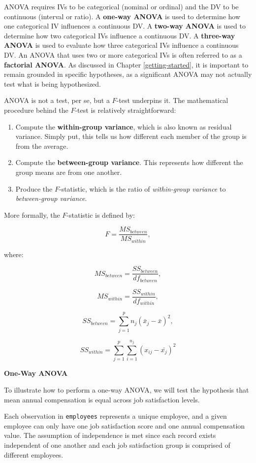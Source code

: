\documentclass[]{book}
\providecommand{\tightlist}{%
  \setlength{\itemsep}{0pt}\setlength{\parskip}{0pt}}
\begin{document}
ANOVA requires IVs to be categorical (nominal or ordinal) and the DV to be continuous (interval or ratio). A \textbf{one-way ANOVA} is used to determine how one categorical IV influences a continuous DV. A \textbf{two-way ANOVA} is used to determine how two categorical IVs influence a continuous DV. A \textbf{three-way ANOVA} is used to evaluate how three categorical IVs influence a continuous DV. An ANOVA that uses two or more categorical IVs is often referred to as a \textbf{factorial ANOVA}. As discussed in Chapter \ref{getting-started}, it is important to remain grounded in specific hypotheses, as a significant ANOVA may not actually test what is being hypothesized.

ANOVA is not a test, per se, but a \(F\)-test underpins it. The mathematical procedure behind the \(F\)-test is relatively straightforward:

\begin{enumerate}
\def\labelenumi{\arabic{enumi}.}
\tightlist
\item
  Compute the \textbf{within-group variance}, which is also known as residual variance. Simply put, this tells us how different each member of the group is from the average.
\item
  Compute the \textbf{between-group variance}. This represents how different the group means are from one another.
\item
  Produce the \(F\)-statistic, which is the ratio of \emph{within-group variance} to \emph{between-group variance}.
\end{enumerate}

More formally, the \(F\)-statistic is defined by:

\[ F = \frac{MS_{between}}{MS_{within}}, \]

where:

\[ MS_{between} = \frac{SS_{between}}{df_{between}}, \]

\[ MS_{within} = \frac{SS_{within}}{df_{within}}, \]

\[ SS_{between} = \displaystyle\sum_{j=1}^{p} n_j(\bar{x}_j-\bar{x})^2, \]

\[ SS_{within} = \displaystyle\sum_{j=1}^{p} \displaystyle\sum_{i=1}^{n_j} (x_{ij}-\bar{x_j})^2 \]

\textbf{One-Way ANOVA}

To illustrate how to perform a one-way ANOVA, we will test the hypothesis that mean annual compensation is equal across job satisfaction levels.

Each observation in \texttt{employees} represents a unique employee, and a given employee can only have one job satisfaction score and one annual compensation value. The assumption of independence is met since each record exists independent of one another and each job satisfaction group is comprised of different employees.
\end{document}
